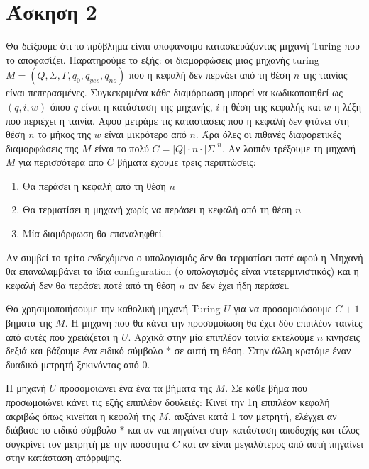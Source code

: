 \documentclass[11pt]{article}
\begin{document}

\section*{Άσκηση 2}
Θα δείξουμε ότι το πρόβλημα είναι αποφάνσιμο κατασκευάζοντας μηχανή Turing που το αποφασίζει.
Παρατηρούμε το εξής: οι διαμορφώσεις μιας μηχανής turing $M=(Q,\Sigma,\Gamma,q_0,q_{yes},q_{no})$ 
που η κεφαλή δεν περνάει από τη θέση $n$ της ταινίας είναι πεπερασμένες. Συγκεκριμένα κάθε διαμόρφωση μπορεί
να κωδικοποιηθεί ως $(q,i,w)$ όπου $q$ είναι η κατάσταση της μηχανής, $i$ η θέση της κεφαλής και $w$ η 
λέξη που περιέχει η ταινία.  Αφού μετράμε τις καταστάσεις που η κεφαλή δεν φτάνει στη θέση $n$ το
μήκος της $w$ είναι μικρότερο από $n$.  Άρα όλες οι πιθανές διαφορετικές διαμορφώσεις της $M$ είναι το 
πολύ $C=|Q|\cdot n\cdot |\Sigma|^n$. Αν λοιπόν τρέξουμε τη μηχανή $M$ για περισσότερα από $C$ βήματα
έχουμε τρεις περιπτώσεις: 
\begin{enumerate}
    \item Θα περάσει η κεφαλή από τη θέση $n$
    \item Θα τερματίσει η μηχανή χωρίς να περάσει η κεφαλή από τη θέση $n$
    \item Μία διαμόρφωση θα επαναληφθεί.
\end{enumerate}
Αν συμβεί το τρίτο ενδεχόμενο ο υπολογισμός δεν θα τερματίσει ποτέ αφού η Μηχανή θα επαναλαμβάνει 
τα ίδια configuration (ο υπολογισμός είναι ντετερμινιστικός) και η κεφαλή δεν θα περάσει ποτέ από 
τη θέση $n$ αν δεν έχει ήδη περάσει.

Θα χρησιμοποιήσουμε την καθολική μηχανή Turing $U$ για να προσομοιώσουμε $C+1$ βήματα της $M$. 
Η μηχανή που θα κάνει την προσομοίωση θα έχει δύο επιπλέον ταινίες από αυτές που χρειάζεται 
η $U$. Αρχικά στην μία επιπλέον ταινία εκτελούμε $n$ κινήσεις δεξιά και βάζουμε ένα ειδικό 
σύμβολο $*$ σε αυτή τη θέση. Στην άλλη κρατάμε έναν δυαδικό μετρητή ξεκινόντας από $0$. 

Η μηχανή $U$ προσομοιώνει ένα ένα τα βήματα της $Μ$. Σε κάθε βήμα που προσωμοιώνει κάνει τις εξής
επιπλέον δουλειές: Κινεί την 1η επιπλέον κεφαλή ακριβώς όπως κινείται η κεφαλή της $M$, αυξάνει 
κατά 1 τον μετρητή, ελέγχει αν διάβασε το ειδικό σύμβολο $*$ και αν ναι πηγαίνει στην κατάσταση αποδοχής 
και τέλος συγκρίνει τον μετρητή με την ποσότητα $C$ και αν είναι μεγαλύτερος από αυτή πηγαίνει 
στην κατάσταση απόρριψης.
                                                              
\end{document}
